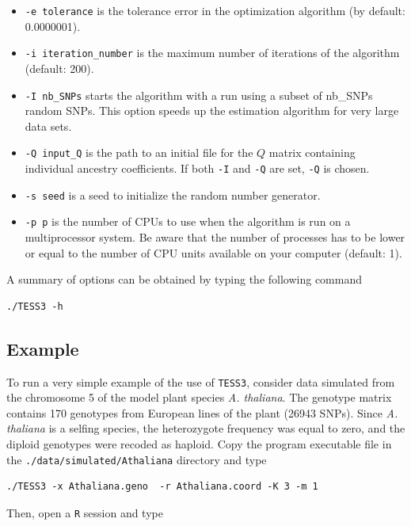 \documentclass[10pt,a4paper]{article}
\begin{document}
\begin{itemize}
\item \verb|-e tolerance| is the tolerance error in the optimization algorithm (by default: 0.0000001). 
\item \verb|-i iteration_number| is the maximum number of iterations of the algorithm (default: 200). 
\item \verb|-I nb_SNPs| starts the algorithm with a run using a subset of nb\_SNPs random SNPs. This option speeds up the estimation algorithm for very large data sets.
\item \verb|-Q input_Q| is the path to an initial file for the $Q$ matrix containing individual ancestry coefficients. If both \verb|-I| and \verb|-Q| are set, \verb|-Q| is chosen.
\item \verb|-s seed| is a seed to initialize the random number generator. 
\item \verb|-p p| is the number of CPUs to use when the algorithm is run on a multiprocessor system.
Be aware that the number of processes has to be lower or equal to the number of CPU units available on your computer (default: 1).

\end{itemize}


\noindent A summary of options can be obtained  by typing the following command
\footnotesize
\begin{Verbatim}[frame=single]
./TESS3 -h
\end{Verbatim}
\noindent
\normalsize


\subsection{Example}\label{sec:ex}

To run a very simple example of the use of {\tt TESS3}, consider data simulated from the chromosome 5 of the model plant species {\it A. thaliana}. The genotype matrix contains 170 genotypes from European lines of the plant (26943 SNPs). Since {\it A. thaliana} is a selfing species, the heterozygote frequency was equal to zero, and the diploid genotypes were recoded as haploid. Copy the program executable file in the {\tt ./data/simulated/Athaliana} directory and type

\begin{Verbatim}[frame=single]
./TESS3 -x Athaliana.geno  -r Athaliana.coord -K 3 -m 1
\end{Verbatim}

\noindent Then, open a {\tt R} session and type
\end{document}
